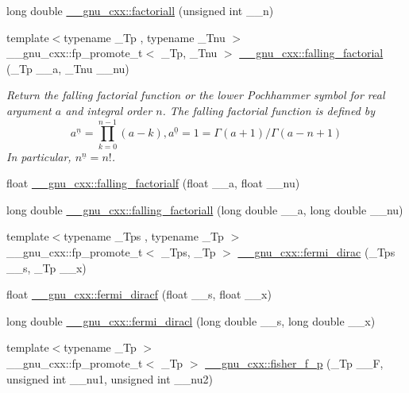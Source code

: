 \begin{DoxyCompactItemize}
\item 
long double \hyperlink{group__gnu__math__spec__func_ga0904e504fdc3c8b9b6f5c66a73531584}{\+\_\+\+\_\+gnu\+\_\+cxx\+::factoriall} (unsigned int \+\_\+\+\_\+n)
\item 
{\footnotesize template$<$typename \+\_\+\+Tp , typename \+\_\+\+Tnu $>$ }\\\+\_\+\+\_\+gnu\+\_\+cxx\+::fp\+\_\+promote\+\_\+t$<$ \+\_\+\+Tp, \+\_\+\+Tnu $>$ \hyperlink{group__gnu__math__spec__func_ga3cc8eb6068c7155ec48b40e20160c5c0}{\+\_\+\+\_\+gnu\+\_\+cxx\+::falling\+\_\+factorial} (\+\_\+\+Tp \+\_\+\+\_\+a, \+\_\+\+Tnu \+\_\+\+\_\+nu)
\begin{DoxyCompactList}\small\item\em Return the falling factorial function or the lower Pochhammer symbol for real argument $ a $ and integral order $ n $. The falling factorial function is defined by \[ a^{\underline{n}} = \prod_{k=0}^{n-1} (a - k), a^{\underline{0}} = 1 = \Gamma(a + 1) / \Gamma(a - n + 1) \] In particular, $ n^{\underline{n}} = n! $. \end{DoxyCompactList}\item 
float \hyperlink{group__gnu__math__spec__func_gaf32abbc790bfa870725728e5470de532}{\+\_\+\+\_\+gnu\+\_\+cxx\+::falling\+\_\+factorialf} (float \+\_\+\+\_\+a, float \+\_\+\+\_\+nu)
\item 
long double \hyperlink{group__gnu__math__spec__func_gab816c3bcbe00595881799ce969475085}{\+\_\+\+\_\+gnu\+\_\+cxx\+::falling\+\_\+factoriall} (long double \+\_\+\+\_\+a, long double \+\_\+\+\_\+nu)
\item 
{\footnotesize template$<$typename \+\_\+\+Tps , typename \+\_\+\+Tp $>$ }\\\+\_\+\+\_\+gnu\+\_\+cxx\+::fp\+\_\+promote\+\_\+t$<$ \+\_\+\+Tps, \+\_\+\+Tp $>$ \hyperlink{group__gnu__math__spec__func_ga5468fbaed5cb8384cff7cfb9d2188d1a}{\+\_\+\+\_\+gnu\+\_\+cxx\+::fermi\+\_\+dirac} (\+\_\+\+Tps \+\_\+\+\_\+s, \+\_\+\+Tp \+\_\+\+\_\+x)
\item 
float \hyperlink{group__gnu__math__spec__func_gacf7f49b2b7bf50fd37d939236712cbe2}{\+\_\+\+\_\+gnu\+\_\+cxx\+::fermi\+\_\+diracf} (float \+\_\+\+\_\+s, float \+\_\+\+\_\+x)
\item 
long double \hyperlink{group__gnu__math__spec__func_ga3876af54a92853036cc88ec6b8ea5d67}{\+\_\+\+\_\+gnu\+\_\+cxx\+::fermi\+\_\+diracl} (long double \+\_\+\+\_\+s, long double \+\_\+\+\_\+x)
\item 
{\footnotesize template$<$typename \+\_\+\+Tp $>$ }\\\+\_\+\+\_\+gnu\+\_\+cxx\+::fp\+\_\+promote\+\_\+t$<$ \+\_\+\+Tp $>$ \hyperlink{group__gnu__math__spec__func_ga1c769cbf42c1abecc6881cfe67dc6d14}{\+\_\+\+\_\+gnu\+\_\+cxx\+::fisher\+\_\+f\+\_\+p} (\+\_\+\+Tp \+\_\+\+\_\+F, unsigned int \+\_\+\+\_\+nu1, unsigned int \+\_\+\+\_\+nu2)

\end{DoxyCompactItemize}
